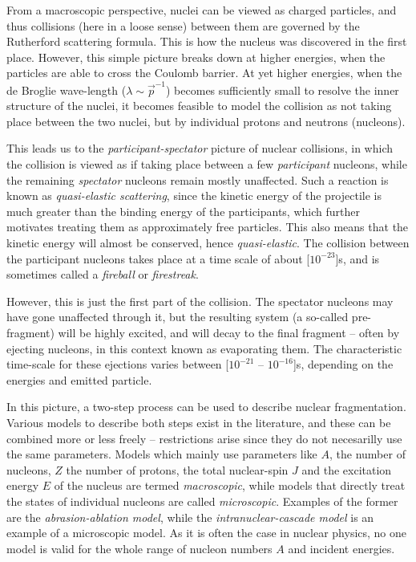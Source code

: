 From a macroscopic perspective, nuclei can be viewed as charged particles, and thus collisions (here in a loose sense) between them are governed by the Rutherford scattering formula.
This is how the nucleus was discovered in the first place. However, this simple picture breaks down at higher energies, when the particles are able to cross the Coulomb barrier.
At yet higher energies, when the de Broglie wave-length ($\lambda \sim \vec{p}^{-1}$) becomes sufficiently small to resolve the inner structure of the nuclei, it becomes feasible to model the collision as not taking place between the two nuclei, but by individual protons and neutrons (nucleons).

This leads us to the \emph{participant-spectator} picture of nuclear collisions, in which the collision is viewed as if taking place between a few \emph{participant} nucleons, while the remaining \emph{spectator} nucleons remain mostly unaffected. Such a reaction is known as \emph{quasi-elastic scattering}, since the kinetic energy of the projectile is much greater than the binding energy of the participants, which further motivates treating them as approximately free particles. This also means that the kinetic energy will almost be conserved, hence \emph{quasi-elastic}.
The collision between the participant nucleons takes place at a time scale of about \unit[$10^{-23}$]{s}\cite{gaimard:1991:art}, and is sometimes called a \emph{fireball} or \emph{firestreak}.

However, this is just the first part of the collision. The spectator nucleons may have gone unaffected through it, but the resulting system (a so-called pre-fragment) will be highly excited, and will decay to the final fragment -- often by ejecting nucleons, in this context known as evaporating them. The characteristic time-scale for these ejections varies between \unit[$10^{-21}$ -- $10^{-16}$]{s}, depending on the energies and emitted particle\cite{gaimard:1991:art}. 

In this picture, a two-step process can be used to describe nuclear fragmentation. 
Various models to describe both steps exist in the literature, and these can be combined more or less freely -- restrictions arise since they do not necesarilly use the same parameters. Models which mainly use parameters like $A$, the number of nucleons, $Z$ the number of protons, the total nuclear-spin $J$ and the excitation energy $E$ of the nucleus are termed \emph{macroscopic}, while models that directly treat the states of individual nucleons are called \emph{microscopic}. Examples of the former are the \emph{abrasion-ablation model}\cite{bowman:1973:book}, while the \emph{intranuclear-cascade model}\cite{metropolis:1991:art} is an example of a microscopic model. As it is often the case in nuclear physics, no one model is valid for the whole range of nucleon numbers $A$ and incident energies\cite{cucinotta:1998:art}.

